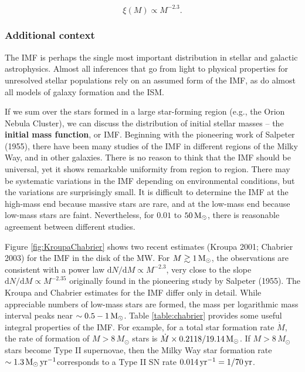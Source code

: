 \documentclass[a4paper,10pt]{article}
\begin{document}
\begin{equation*}
\xi(M) \propto M^{-2.3}.
\end{equation*}

\subsubsection{Additional context}

The IMF is perhaps the single most important distribution in stellar and galactic astrophysics. Almost all inferences that go from light to physical properties for unresolved stellar populations rely on an assumed form of the IMF, as do almost all models of galaxy formation and the ISM.

{\noindent}If we sum over the stars formed in a large star-forming region (e.g., the Orion Nebula Cluster), we can discuss the distribution of initial stellar masses -- the \textbf{initial mass function}, or IMF. Beginning with the pioneering work of Salpeter (1955), there have been many studies of the IMF in different regions of the Milky Way, and in other galaxies. There is no reason to think that the IMF should be universal, yet it shows remarkable uniformity from region to region. There may be systematic variations in the IMF depending on environmental conditions, but the variations are surprisingly small. It is difficult to determine the IMF at the high-mass end because massive stars are rare, and at the low-mass end because low-mass stars are faint. Nevertheless, for $0.01$ to $50\,{\rm M_\odot}$, there is reasonable agreement between different studies.

{\noindent}Figure \ref{fig:KroupaChabrier} shows two recent estimates (Kroupa 2001; Chabrier 2003) for the IMF in the disk of the MW. For $M\gtrsim1\,{\rm M_\odot}$, the observations are consistent with a power law $\mathrm{d}N/\mathrm{d}M\propto M^{-2.3}$, very close to the slope $\mathrm{d}N/\mathrm{d}M\propto M^{-2.35}$ originally found in the pioneering study by Salpeter (1955). The Kroupa and Chabrier estimates for the IMF differ only in detail. While appreciable numbers of low-mass stars are formed, the mass per logarithmic mass interval peaks near $\sim0.5-1\,{\rm M_\odot}$. Table \ref{table:chabrier} provides some useful integral properties of the IMF. For example, for a total star formation rate $\dot{M}$, the rate of formation of $M>8\,{M_\odot}$ stars is $\dot{M}\times0.2118/19.14\,{\rm M_\odot}$. If $M>8\,{M_\odot}$ stars become Type II supernovae, then the Milky Way star formation rate $\sim1.3\,{\rm M_\odot\,yr^{-1}}$corresponds to a Type II SN rate $0.014\,{\rm yr^{-1}}=1/70\,{\rm yr}$.
\end{document}
